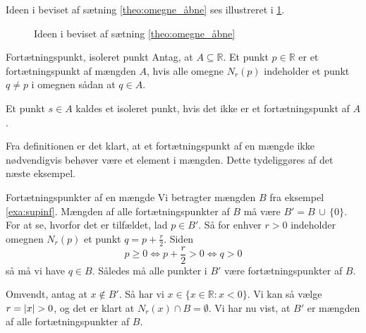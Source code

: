Ideen i beviset af sætning \ref{theo:omegne_åbne} ses illustreret i \cref{fig:omegne_åbne}.

\begin{figure}[H]
\begin{center}
\end{center}
  \caption{Ideen i beviset af sætning \ref{theo:omegne_åbne}}
\label{fig:omegne_åbne}
\end{figure}

\begin{definition}[label=def:fortætningspunkt]{Fortætningspunkt, isoleret punkt}{}
  Antag, at $A \subseteq \mathbb{R}$.
  Et punkt $p \in \mathbb{R}$ er et fortætningspunkt af mængden $A$, hvis alle omegne $N_r(p)$ indeholder et punkt $q \neq p$ i omegnen sådan at $q \in A$. 

Et punkt $s \in A$ kaldes et isoleret punkt, hvis det ikke er et fortætningspunkt af $A$. 
\end{definition}

Fra definitionen er det klart, at et fortætningspunkt af en mængde ikke nødvendigvis behøver være et element i mængden.
Dette tydeliggøres af det næste eksempel.

\begin{example}[label=exa:fortætningspunkter]{Fortætningspunkter af en mængde}{}
  Vi betragter mængden $B$ fra eksempel \ref{exa:supinf}. 
  Mængden af alle fortætningspunkter af $B$ må være $B'=B\, \cup\, \{ 0 \} $. 
For at se, hvorfor det er tilfældet, lad $p \in B'$.
  Så for enhver $r>0$ indeholder omegnen $N_r(p)$ et punkt $q=p+\frac{r}{2}$.
  Siden 
  \[
  p \geq 0 \iff p + \frac{r}{2} > 0 \iff q>0
  \] 
  så må vi have $q \in B$.
  Således må alle punkter i $B'$ være fortætningspunkter af $B$. 

  Omvendt, antag at $x \not\in B'$.
  Så har vi $x \in \{ x \in \mathbb{R}: x < 0 \} $.
  Vi kan så vælge $r=\abs{x} >0$, og det er klart at $N_r(x) \cap B = \emptyset$.
  Vi har nu vist, at $B'$ er mængden af alle fortætningspunkter af $B$.
\end{example}

